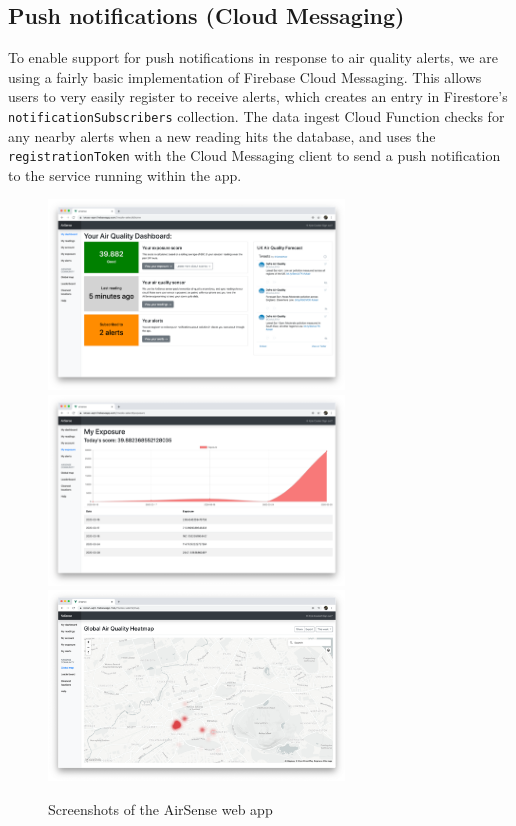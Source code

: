 \documentclass[sigconf, nonacm]{acmart}
\begin{document}
\subsection{Push notifications (Cloud Messaging)}

To enable support for push notifications in response to air quality alerts, we are using a fairly basic 
implementation of Firebase Cloud Messaging\cite{firebase_messaging}. This allows users to very easily register to receive alerts,
which creates an entry in Firestore's \texttt{notificationSubscribers} collection. The data ingest Cloud
Function checks for any nearby alerts when a new reading hits the database, and uses the 
\texttt{registrationToken} with the Cloud Messaging client to send a push notification to the service
running within the app.

\begin{figure}[p]
	\includegraphics[width=0.7\textwidth]{webapp-1}
	\includegraphics[width=0.7\textwidth]{webapp-2}
	\includegraphics[width=0.7\textwidth]{webapp-3}
	\caption{Screenshots of the AirSense web app}
	\label{fig:webapp}
\end{figure}
\end{document}

